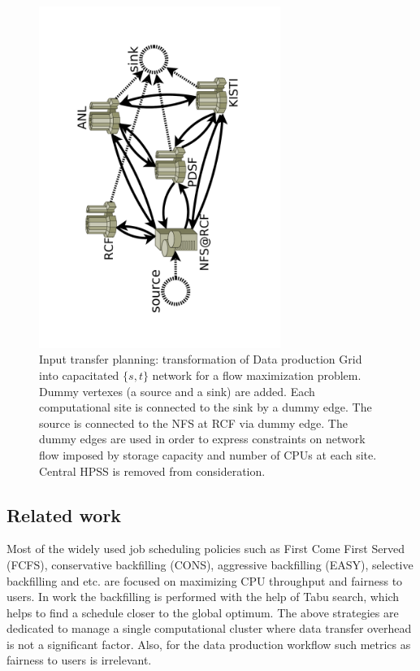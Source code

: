 \documentclass[english]{ddny}
\begin{document}
\begin{figure}[h]
	\begin{center}
		\includegraphics [trim= 30mm 30mm 30mm 30mm , clip, angle =-90, width=0.7\textwidth]{pic/real_network.pdf}
	\end{center}
	\caption{Input transfer planning: transformation of Data production Grid into   capacitated $\{s,t\}$ network for a flow maximization problem. Dummy vertexes (a source and a sink) are added. Each computational site is connected to the sink by a dummy edge. The source is connected to the NFS at RCF via dummy edge. The dummy edges are used in order to express constraints on network flow imposed by storage capacity and number of CPUs at each site.  Central HPSS is removed from consideration.}
	\label{real_network}
\end{figure} 

\subsection{Related work}
Most of the widely used job scheduling policies such as First Come First Served (FCFS), conservative backfilling (CONS), aggressive backfilling (EASY), selective backfilling and etc. \cite{srinivasan2002selective} are focused on maximizing CPU throughput and fairness to users. In work  \cite{Rudova_Tabu_search} the backfilling is performed with the help of Tabu search, which helps to find a schedule closer to the global optimum. %
 The above strategies are dedicated to manage a single computational cluster where data transfer overhead is not a significant factor. Also, for the data production workflow such metrics as fairness to users is irrelevant.
 
\end{document}
